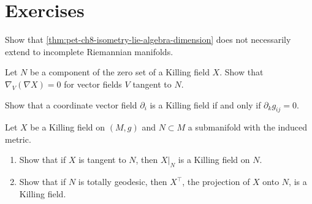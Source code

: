 \section{Exercises}

\begin{remark}[Exercise 8.4.1]
  \label{rem:pet-ch8-ex-8-4-1}
  Show that \cref{thm:pet-ch8-isometry-lie-algebra-dimension} does not
  necessarily extend to incomplete Riemannian manifolds.
\end{remark}

\begin{remark}[Exercise 8.4.2]
  \label{rem:pet-ch8-ex-8-4-2}
  Let $N$ be a component of the zero set of a Killing field $X$. Show that
  $\nabla_V(\nabla X)=0$ for vector fields $V$ tangent to $N$.
\end{remark}

\begin{remark}[Exercise 8.4.3]
  \label{rem:pet-ch8-ex-8-4-3}
  Show that a coordinate vector field $\partial_i$ is a Killing field if and
  only if $\partial_kg_{ij}=0$.
\end{remark}

\begin{remark}[Exercise 8.4.4]
  \label{rem:pet-ch8-ex-8-4-4}
  Let $X$ be a Killing field on $(M,g)$ and $N\subset M$ a submanifold with the
  induced metric.
  \begin{enumerate}
    \item Show that if $X$ is tangent to $N$, then $X|_N$ is a Killing field
      on $N$.
    \item Show that if $N$ is totally geodesic, then $X^\top$, the projection
      of $X$ onto $N$, is a Killing field.
  \end{enumerate}
\end{remark}

